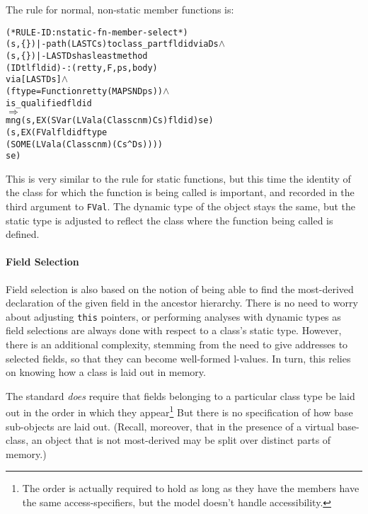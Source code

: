 \documentclass[11pt]{article}
\newcommand{\lbr}{\texttt{\{}}
\newcommand{\rbr}{\texttt{\}}}
\begin{document}
The rule for normal, non-static  member functions is:
\begin{center}
\begin{minipage}{\textwidth}
%
\begin{alltt}
(* RULE-ID: nstatic-fn-member-select *)
     (s,\lbr\rbr) |- path (LAST Cs) to class_part fldid via Ds \(\land\)
     (s,\lbr\rbr) |- LAST Ds has least method
                  (IDtl fldid) -: (retty,F,ps,body)
                  via [LAST Ds] \(\land\)
     (ftype = Function retty (MAP SND ps)) \(\land\)
     is_qualified fldid
   \(\Rightarrow\)
     mng (s, EX (SVar (LVal a (Class cnm) Cs) fldid) se)
         (s, EX (FVal fldid ftype
                      (SOME (LVal a (Class cnm) (Cs ^ Ds))))
                se)
\end{alltt}
\end{minipage}
\end{center}
This is very similar to the rule for static functions, but this time
the identity of the class for which the function is being called is
important, and recorded in the third argument to \texttt{FVal}.  The
dynamic type of the object stays the same, but the static type is
adjusted to reflect the class where the function being called is
defined.

\paragraph{Field Selection}
Field selection is also based on the notion of being able to find the
most-derived declaration of the given field in the ancestor hierarchy.
There is no need to worry about adjusting \texttt{this} pointers, or
performing analyses with dynamic types as field selections are always
done with respect to a class's static type.  However, there is an
additional complexity, stemming from the need to give addresses to
selected fields, so that they can become well-formed l-values.  In
turn, this relies on knowing how a class is laid out in memory.

The standard \emph{does} require that fields belonging to a particular
class type be laid out in the order in which they appear\footnote{The
  order is actually required to hold as long as they have the members
  have the same access-specifiers, but the model doesn't handle
  accessibility.}  But there is no specification of how base
sub-objects are laid out.  (Recall, moreover, that in the presence of
a virtual base-class, an object that is not most-derived may be split
over distinct parts of memory.)
\end{document}
